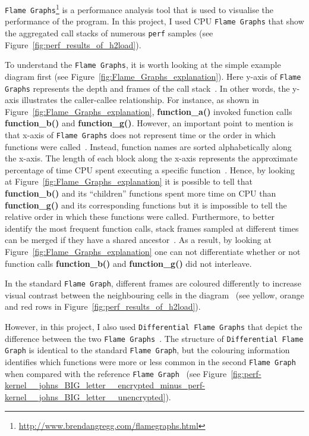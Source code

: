 \documentclass[12pt,a4paper]{report}
\begin{document}
\texttt{Flame Graphs}\footnote{\url{http://www.brendangregg.com/flamegraphs.html}} is a performance analysis tool that is used to visualise the performance of the program.
In this project, I used CPU \texttt{Flame Graphs} that show the aggregated call stacks of numerous \texttt{perf} samples (see Figure~\ref{fig:perf_results_of_h2load}).


To understand the \texttt{Flame Graphs}, it is worth looking at the simple example diagram first (see Figure~\ref{fig:Flame_Graphs_explanation}).
Here y-axis of \texttt{Flame Graphs} represents the depth and frames of the call stack~\cite{CPU_Flame_graphs}.
In other words, the y-axis illustrates the caller-callee relationship.
For instance, as shown in Figure~\ref{fig:Flame_Graphs_explanation}, \textbf{function\_a()} invoked function calls \textbf{function\_b()} and \textbf{function\_g()}. 
However, an important point to mention is that x-axis of \texttt{Flame Graphs} does not represent time or the order in which functions were called~\cite{CPU_Flame_graphs}.
Instead, function names are sorted alphabetically along the x-axis. The length of each block along the x-axis represents the approximate percentage of time CPU spent executing a specific function~\cite{CPU_Flame_graphs}.
Hence, by looking at Figure~\ref{fig:Flame_Graphs_explanation} it is possible to tell that \textbf{function\_b()} and its \enquote{children} functions spent more time on CPU than \textbf{function\_g()} and its corresponding functions but it is impossible to tell the relative order in which these functions were called.
Furthermore, to better identify the most frequent function calls, stack frames sampled at different times can be merged if they have a shared ancestor~\cite{CPU_Flame_graphs}.
As a result, by looking at Figure~\ref{fig:Flame_Graphs_explanation} one can not differentiate whether or not function calls \textbf{function\_b()} and \textbf{function\_g()} did not interleave.

In the standard \texttt{Flame Graph}, different frames are coloured differently to increase visual contrast between the neighbouring cells in the diagram~\cite{CPU_Flame_graphs} (see yellow, orange and red rows in Figure~\ref{fig:perf_results_of_h2load}).


However, in this project, I also used \texttt{Differential Flame Graphs} that depict the difference between the two \texttt{Flame Graphs}~\cite{Differential_Flame_Graphs}.
The structure of \texttt{Differential Flame Graph} is identical to the standard \texttt{Flame Graph}, but the colouring information identifies which functions were more or less common in the second \texttt{Flame Graph} when compared with the reference \texttt{Flame Graph}~\cite{Differential_Flame_Graphs} (see Figure~\ref{fig:perf-kernel__johns_BIG_letter__encrypted_minus_perf-kernel__johns_BIG_letter__unencrypted}).
\end{document}
